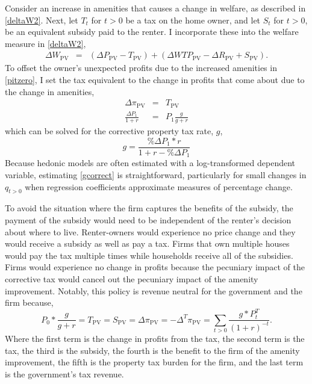 \documentclass[ecta,nameyear,draft]{econsocart}
\theoremstyle{plain}
\theoremstyle{remark}
\begin{document}
Consider an increase in amenities that causes a change in welfare, as described in \ref{deltaW2}. Next, let $T_t$ for $t>0$ be a tax on the home owner, and let $S_t$ for $t>0$, be an equivalent subsidy paid to the renter. I incorporate these into the welfare measure in \ref{deltaW2},
\begin{eqnarray*}
	\Delta W_{\mathrm{PV}}&=& \left(\Delta P_{\mathrm{PV}}-T_{\mathrm{PV}}\right)+\left(\Delta\mathit{WTP}_\mathrm{PV}-\Delta R_{\mathrm{PV}}+S_{\mathrm{PV}}\right).\nonumber
\end{eqnarray*}
To offset the owner's unexpected profits due to the increased amenities in \ref{pitzero}, I set the tax equivalent to the change in profits that come about due to the change in amenities,
\begin{eqnarray*}
 \Delta \pi_{\mathrm{PV}}&=&T_{\mathrm{PV}}\\
\frac{\Delta P_1}{1+r}&=&P_1\frac{g}{g+r}
\end{eqnarray*}
which can be solved for the corrective property tax rate, $g$,
\begin{equation}
	g=\frac{\% \Delta P_1*r}{1+r-\% \Delta P_1} \label{gcorrect}
\end{equation}
Because hedonic models are often estimated with a log-transformed dependent variable, estimating \ref{gcorrect} is straightforward, particularly for small changes in $q_{t>0}$ when regression coefficients approximate measures of percentage change. 

To avoid the situation where the firm captures the benefits of the subsidy, the payment of the subsidy would need to be independent of the renter's decision about where to live. Renter-owners would experience no price change and they would receive a subsidy as well as pay a tax. Firms that own multiple houses would pay the tax multiple times while households receive all of the subsidies. Firms would experience no change in profits because the pecuniary impact of the corrective tax would cancel out the pecuniary impact of the amenity improvement.
Notably, this policy is revenue neutral for the government and the firm because, 
\begin{equation*}
	P_0*\frac{g}{g+r}=T_{\mathrm{PV}}=S_{\mathrm{PV}}=\Delta \pi_{\mathrm{PV}}=-\Delta^T \pi_{\mathrm{PV}}=\sum_{t>0}\frac{g*P_t^T}{(1+r)^{-t}}.
\end{equation*}
Where the first term is the change in profits from the tax, the second term is the tax, the third is the subsidy, the fourth is the benefit to the firm of the amenity improvement, the fifth is the property tax burden for the firm, and the last term is the government's tax revenue. 
\end{document}
